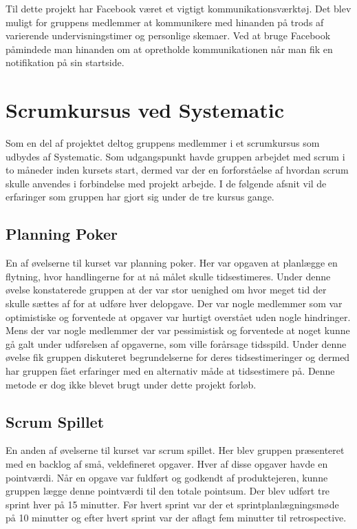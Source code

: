 Til dette projekt har Facebook været et vigtigt kommunikationsværktøj. Det blev muligt for gruppens medlemmer at kommunikere med hinanden på trods af varierende undervisningstimer og personlige skemaer. Ved at bruge Facebook påmindede man hinanden om at opretholde kommunikationen når man fik en notifikation på sin startside.

\chapter{Scrumkursus ved Systematic}
Som en del af projektet deltog gruppens medlemmer i et scrumkursus som udbydes af Systematic. Som udgangspunkt havde gruppen arbejdet med scrum i to måneder inden kursets start, dermed var der en forforståelse af hvordan scrum skulle anvendes i forbindelse med projekt arbejde. I de følgende afsnit vil de erfaringer som gruppen har gjort sig under de tre kursus gange. 

\section{Planning Poker}
En af øvelserne til kurset var planning poker. Her var opgaven at planlægge en flytning, hvor handlingerne for at nå målet skulle tidsestimeres. Under denne øvelse konstaterede gruppen at der var stor uenighed om hvor meget tid der skulle sættes af for at udføre hver delopgave. Der var nogle medlemmer som var optimistiske og forventede at opgaver var hurtigt overstået uden nogle hindringer. Mens der var nogle medlemmer der var pessimistisk og forventede at noget kunne gå galt under udførelsen af opgaverne, som ville forårsage tidsspild. Under denne øvelse fik gruppen diskuteret begrundelserne for deres tidsestimeringer og dermed har gruppen fået erfaringer med en alternativ måde at tidsestimere på. Denne metode er dog ikke blevet brugt under dette projekt forløb.  

\section{Scrum Spillet}
En anden af øvelserne til kurset var scrum spillet. Her blev gruppen præsenteret med en backlog af små, veldefineret opgaver. Hver af disse opgaver havde en pointværdi. Når en opgave var fuldført og godkendt af produktejeren, kunne gruppen lægge denne pointværdi til den totale pointsum. Der blev udført tre sprint hver på 15 minutter. Før hvert sprint var der et sprintplanlægningsmøde på 10 minutter og efter hvert sprint var der aflagt fem minutter til retrospective. \newline

